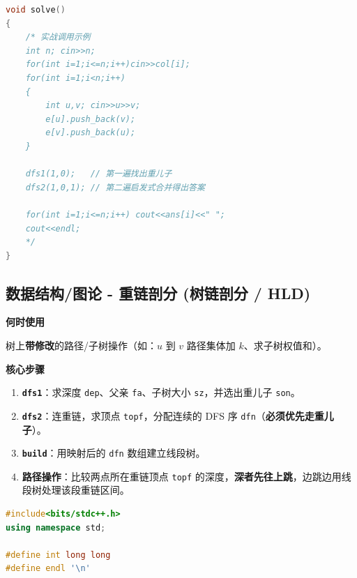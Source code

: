 \documentclass[10pt,landscape,a4paper]{article}
\begin{document}
\begin{multicols*}{3}
\begin{lstlisting}[language=C++]
void solve()
{
    /* 实战调用示例
    int n; cin>>n;
    for(int i=1;i<=n;i++)cin>>col[i];
    for(int i=1;i<n;i++)
    {
        int u,v; cin>>u>>v;
        e[u].push_back(v);
        e[v].push_back(u);
    }
    
    dfs1(1,0);   // 第一遍找出重儿子
    dfs2(1,0,1); // 第二遍启发式合并得出答案
    
    for(int i=1;i<=n;i++) cout<<ans[i]<<" ";
    cout<<endl;
    */
}
\end{lstlisting}
\subsection*{数据结构/图论 - 重链剖分 (树链剖分 / HLD)}
\par\addvspace{0.7ex}\noindent\textbf{何时使用}\par\nobreak
树上\textbf{带修改}的路径/子树操作（如：$u$ 到 $v$ 路径集体加 $k$、求子树权值和）。\par
\par\addvspace{0.7ex}\noindent\textbf{核心步骤}\par\nobreak
\begin{enumerate}[start=1]
\item \textbf{\texttt{d\allowbreak{}f\allowbreak{}s\allowbreak{}1}}：求深度 \texttt{d\allowbreak{}e\allowbreak{}p}、父亲 \texttt{f\allowbreak{}a}、子树大小 \texttt{s\allowbreak{}z}，并选出重儿子 \texttt{s\allowbreak{}o\allowbreak{}n}。
\item \textbf{\texttt{d\allowbreak{}f\allowbreak{}s\allowbreak{}2}}：连重链，求顶点 \texttt{t\allowbreak{}o\allowbreak{}p\allowbreak{}f}，分配连续的 DFS 序 \texttt{d\allowbreak{}f\allowbreak{}n}（\textbf{必须优先走重儿子}）。
\item \textbf{\texttt{b\allowbreak{}u\allowbreak{}i\allowbreak{}l\allowbreak{}d}}：用映射后的 \texttt{d\allowbreak{}f\allowbreak{}n} 数组建立线段树。
\item \textbf{路径操作}：比较两点所在重链顶点 \texttt{t\allowbreak{}o\allowbreak{}p\allowbreak{}f} 的深度，\textbf{深者先往上跳}，边跳边用线段树处理该段重链区间。
\end{enumerate}
\par{}\par
\begin{lstlisting}[language=C++]
#include<bits/stdc++.h>
using namespace std;

#define int long long
#define endl '\n'


\end{lstlisting}
\end{multicols*}
\end{document}
